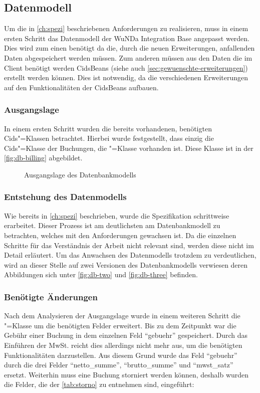 \subsection{Datenmodell}
Um die in \autoref{ch:spezi} beschriebenen Anforderungen zu realisieren, muss in einem ersten Schritt das Datenmodell der \ac{WuNDa} Integration Base angepasst werden.
Dies wird zum einen benötigt da die, durch die neuen Erweiterungen, anfallenden Daten abgespeichert werden müssen.
Zum anderen müssen aus den Daten die im Client benötigt werden CidsBeans (siehe auch \autoref{sec:gewuenschte-erweiterungen}) erstellt werden können.
Dies ist notwendig, da die verschiedenen Erweiterungen auf den Funktionalitäten der CidsBeans aufbauen.

\subsubsection{Ausgangslage}
In einem ersten Schritt wurden die bereits vorhandenen, benötigten Cids"=Klassen betrachtet. Hierbei wurde festgestellt, dass einzig die Cids"=Klasse der Buchungen, die "=Klasse vorhanden ist. Diese Klasse ist in der \autoref{fig:db-billing} abgebildet.
\begin{figure}[htb]
	\centering
	\caption{Ausgangslage des Datenbankmodells}
	\label{fig:db-billing}
\end{figure}

\subsubsection{Entstehung des Datenmodells}
Wie bereits in \autoref{ch:spezi} beschrieben, wurde die Spezifikation schrittweise erarbeitet.
Dieser Prozess ist am deutlichsten am Datenbankmodell zu betrachten, welches mit den Anforderungen gewachsen ist.
Da die einzelnen Schritte für das Verständnis der Arbeit nicht relevant sind, werden diese nicht im Detail erläutert.
Um das Anwachsen des Datenmodells trotzdem zu verdeutlichen, wird an dieser Stelle auf zwei Versionen des Datenbankmodells verwiesen deren Abbildungen sich unter \ref{fig:db-two} und \ref{fig:db-three} befinden.

\subsubsection{Benötigte Änderungen}
Nach dem Analysieren der Ausgangslage wurde in einem weiteren Schritt die "=Klasse um die benötigten Felder erweitert.
Bis zu dem Zeitpunkt war die Gebühr einer Buchung in dem einzelnen Feld "`gebuehr"' gespeichert.
Durch das Einführen der MwSt. reicht dies allerdings nicht mehr aus, um die benötigten Funktionalitäten darzustellen.
Aus diesem Grund wurde das Feld  "`gebuehr"' durch die drei Felder "`netto\_summe"', "`brutto\_summe"' und "`mwst\_satz"' ersetzt.
Weiterhin muss eine Buchung storniert werden können, deshalb wurden die Felder, die der \autoref{tab:storno} zu entnehmen sind, eingeführt:

